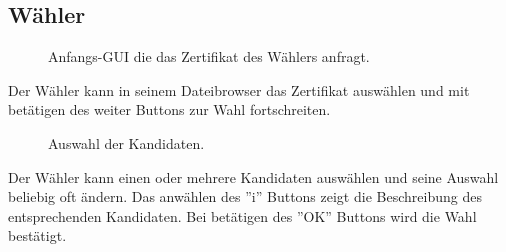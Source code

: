 \documentclass[parskip=full,11pt,twoside]{scrartcl}
\begin{document}
\subsection{Wähler}

\begin{figure}[H]
	\caption{\label{fig:whlr-start}
		Anfangs-GUI die das Zertifikat des Wählers anfragt.
	}
\end{figure}
Der Wähler kann in seinem Dateibrowser das Zertifikat auswählen und mit betätigen des weiter Buttons zur Wahl fortschreiten.

\begin{figure}[H]
	\caption{\label{fig:whlr-wahl}
		Auswahl der Kandidaten.
	}
\end{figure}
Der Wähler kann einen oder mehrere Kandidaten auswählen und seine Auswahl beliebig oft ändern.
Das anwählen des ''i'' Buttons zeigt die Beschreibung des entsprechenden Kandidaten.
Bei betätigen des ''OK'' Buttons wird die Wahl bestätigt.
\end{document}
